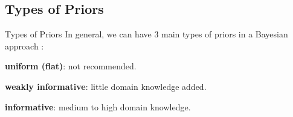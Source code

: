 \subsection{Types of Priors}

\begin{frame}{Types of Priors}
	In general, we can have 3 main types of priors in a Bayesian approach
	\parencite{gelman2013bayesian, mcelreath2020statistical, vandeschootBayesianStatisticsModelling2021}:
	\begin{vfilleditems}
		\item \textbf{uniform (flat)}: not recommended.
		\item \textbf{weakly informative}: little domain knowledge added.
		\item \textbf{informative}: medium to high domain knowledge.
	\end{vfilleditems}
\end{frame}


